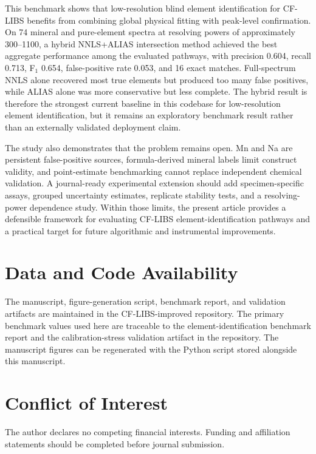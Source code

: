 \documentclass[preprint,12pt,authoryear]{elsarticle}
\begin{document}
This benchmark shows that low-resolution blind element identification for CF-LIBS benefits from combining global physical fitting with peak-level confirmation. On 74 mineral and pure-element spectra at resolving powers of approximately 300--1100, a hybrid NNLS+ALIAS intersection method achieved the best aggregate performance among the evaluated pathways, with precision 0.604, recall 0.713, F$_1$ 0.654, false-positive rate 0.053, and 16 exact matches. Full-spectrum NNLS alone recovered most true elements but produced too many false positives, while ALIAS alone was more conservative but less complete. The hybrid result is therefore the strongest current baseline in this codebase for low-resolution element identification, but it remains an exploratory benchmark result rather than an externally validated deployment claim.

The study also demonstrates that the problem remains open. Mn and Na are persistent false-positive sources, formula-derived mineral labels limit construct validity, and point-estimate benchmarking cannot replace independent chemical validation. A journal-ready experimental extension should add specimen-specific assays, grouped uncertainty estimates, replicate stability tests, and a resolving-power dependence study. Within those limits, the present article provides a defensible framework for evaluating CF-LIBS element-identification pathways and a practical target for future algorithmic and instrumental improvements.

\section*{Data and Code Availability}

The manuscript, figure-generation script, benchmark report, and validation artifacts are maintained in the CF-LIBS-improved repository. The primary benchmark values used here are traceable to the element-identification benchmark report and the calibration-stress validation artifact in the repository. The manuscript figures can be regenerated with the Python script stored alongside this manuscript.

\section*{Conflict of Interest}

The author declares no competing financial interests. Funding and affiliation statements should be completed before journal submission.


\end{document}
